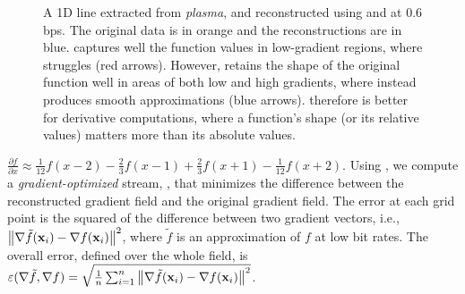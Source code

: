 \begin{figure}[h]
\centering
{}
\caption{A 1D line extracted from \emph{plasma}, and reconstructed using \sbit
and \swav at 0.6 bps. The original data is in orange and the reconstructions
are in blue. \swav captures well the function values in low-gradient regions,
where \sbit struggles (red arrows).  However, \sbit retains the shape of the
original function well in areas of both low and high gradients, where \swav
instead produces smooth approximations (blue arrows). \sbit therefore is better
for derivative computations, where a function's shape (or its relative
values) matters more than its absolute values.}
\label{fig:bit-plane-vs-wavelet-norm-gradient}
\end{figure}

   \mbox{$\frac{\partial f}{\partial
x} \approx \frac{1}{12}f(x-2) - \frac{2}{3}f(x-1) + \frac{2}{3}f(x+1) -
\frac{1}{12}f(x+2)$.}  Using , we compute a
\emph{gradient-optimized} stream, \sgop, that minimizes the difference between
the reconstructed gradient field and the original gradient field. The error at
each grid point   is the squared
 
of the difference between two gradient vectors, i.e., $\norm{\nabla
\tilde{f}(\x_i) - \nabla f(\x_i)}^2$, where $\tilde{f}$ is an approximation of
$f$ at low bit rates. The overall error, defined over the whole field, is
$\err(\nabla \tilde{f}, \nabla f) = \sqrt{\frac{1}{n}
\sum_{i=1}^{n}{\norm{\nabla \tilde{f}(\x_i)-\nabla f(\x_i)}^2}}$.  

